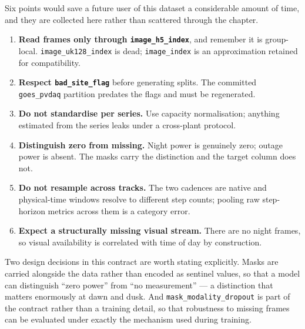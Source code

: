 Six points would save a future user of this dataset a considerable amount of time, and they
are collected here rather than scattered through the chapter.

\begin{enumerate}
  \item \textbf{Read frames only through \texttt{image\_h5\_index}}, and remember it is
    group-local. \texttt{image\_uk128\_index} is dead; \texttt{image\_index} is an
    approximation retained for compatibility.
  \item \textbf{Respect \texttt{bad\_site\_flag}} before generating splits. The committed
    \texttt{goes\_pvdaq} partition predates the flags and must be regenerated.
  \item \textbf{Do not standardise per series.} Use capacity normalisation; anything
    estimated from the series leaks under a cross-plant protocol.
  \item \textbf{Distinguish zero from missing.} Night power is genuinely zero; outage power is
    absent. The masks carry the distinction and the target column does not.
  \item \textbf{Do not resample across tracks.} The two cadences are native and physical-time
    windows resolve to different step counts; pooling raw step-horizon metrics across them is
    a category error.
  \item \textbf{Expect a structurally missing visual stream.} There are no night frames, so
    visual availability is correlated with time of day by construction.
\end{enumerate}

Two design decisions in this contract are worth stating explicitly. Masks are carried
alongside the data rather than encoded as sentinel values, so that a model can distinguish
``zero power'' from ``no measurement'' --- a distinction that matters enormously at dawn and
dusk. And \texttt{mask\_modality\_dropout} is part of the contract rather than a training
detail, so that robustness to missing frames can be evaluated under exactly the mechanism
used during training.

\par

